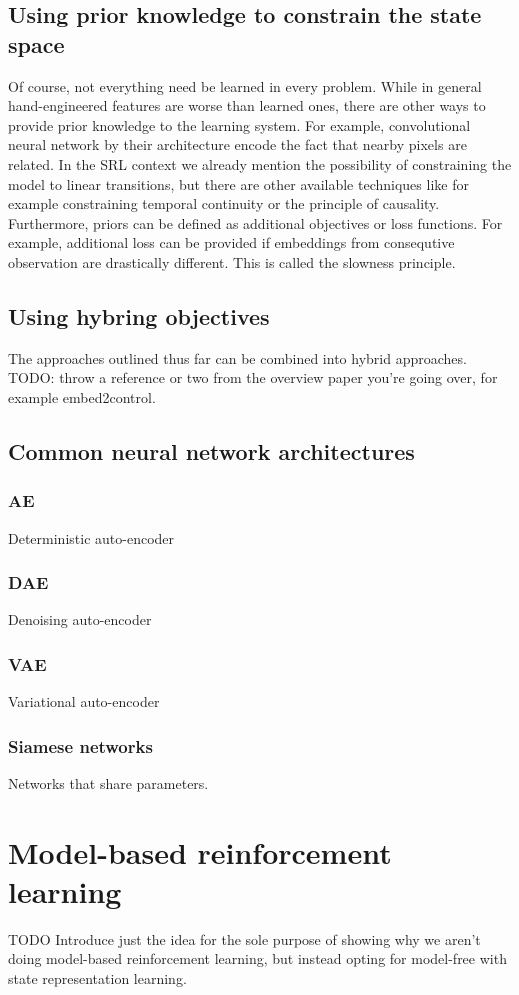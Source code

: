 \subsection{Using prior knowledge to constrain the state space}
Of course, not everything need be learned in every problem.
While in general hand-engineered features are worse than learned ones,
there are other ways to provide prior knowledge to the learning system.
For example, convolutional neural network by their architecture encode
the fact that nearby pixels are related.
In the SRL context we already mention the possibility of constraining 
the model to linear transitions, but there are other available techniques
like for example
constraining temporal continuity or the principle of causality.
Furthermore, priors can be defined as additional objectives or loss functions.
For example, additional loss can be provided if embeddings from
consequtive observation are drastically different.
This is called the slowness principle.

\subsection{Using hybring objectives}
The approaches outlined thus far can be combined into hybrid
approaches.
TODO: throw a reference or two from the overview paper you're going over,
for example embed2control.

\subsection{Common neural network architectures}
\subsubsection{AE}
Deterministic auto-encoder
\subsubsection{DAE}
Denoising auto-encoder
\subsubsection{VAE}
Variational auto-encoder
\subsubsection{Siamese networks}
Networks that share parameters.

\section{Model-based reinforcement learning}
TODO
Introduce just the idea for the sole purpose of
showing why we aren't doing model-based reinforcement learning,
but instead opting for model-free with state representation learning.


